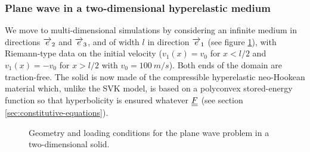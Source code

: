 

\subsubsection*{Plane wave in a two-dimensional hyperelastic medium}
We move to multi-dimensional simulations by considering an infinite medium in directions ${\overrightarrow{e}}_2$ and ${\overrightarrow{e}}_3$, and of width $l$ in direction ${\overrightarrow{e}}_1$ (see figure \ref{fig:2dHEbar}), with Riemann-type data on the initial velocity ($v_1(x)=v_0$ for $x <l/2$ and $v_1(x)=-v_0$ for $x >l/2$ with $v_0=100 \: m/s$). Both ends of the domain are traction-free.
The solid is now made of the compressible hyperelastic neo-Hookean material which, unlike the SVK model, is based on a polyconvex stored-energy function so that hyperbolicity is ensured whatever ${\underline{\underline{F}}}$ (see section \ref{sec:constitutive-equations}).
\begin{figure}[h!]
  \centering
  
  \caption{Geometry and loading conditions for the plane wave problem in a two-dimensional solid.}
  \label{fig:2dHEbar}
\end{figure}

